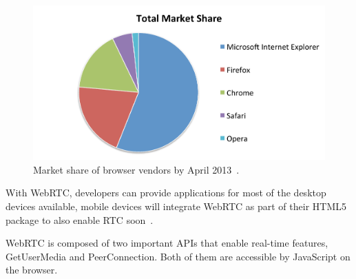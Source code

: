  \begin{figure}[h]
  \centering
    \includegraphics[width=1\textwidth]{./figures/marketshare}
      \caption[Market share of browser vendors by April 2013. Source~\cite{NetMarketShare}]{Market share of browser vendors by April 2013~\cite{NetMarketShare}.}
	\label{fig:marketshare}
\end{figure}

With WebRTC, developers can provide applications for most of the desktop devices available, mobile devices will integrate WebRTC as part of their HTML5 package to also enable RTC soon~\cite{ericssonbowser}.

WebRTC is composed of two important APIs that enable real-time features, GetUserMedia and PeerConnection. Both of them are accessible by JavaScript on the browser. 

%
%

